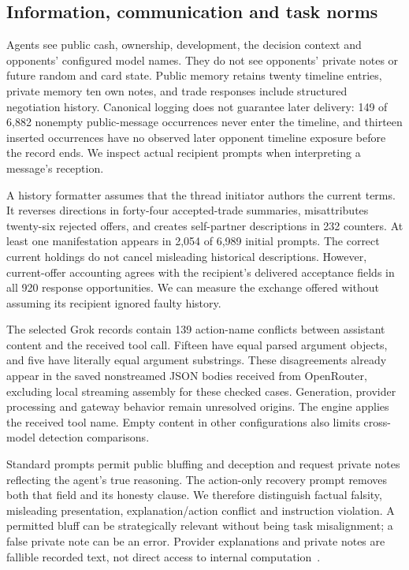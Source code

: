 \subsection{Information, communication and task norms}

Agents see public cash, ownership, development, the decision context and opponents' configured model names. They do not see opponents' private notes or future random and card state. Public memory retains twenty timeline entries, private memory ten own notes, and trade responses include structured negotiation history. Canonical logging does not guarantee later delivery: 149 of 6,882 nonempty public-message occurrences never enter the timeline, and thirteen inserted occurrences have no observed later opponent timeline exposure before the record ends. We inspect actual recipient prompts when interpreting a message's reception.

A history formatter assumes that the thread initiator authors the current terms. It reverses directions in forty-four accepted-trade summaries, misattributes twenty-six rejected offers, and creates self-partner descriptions in 232 counters. At least one manifestation appears in 2,054 of 6,989 initial prompts. The correct current holdings do not cancel misleading historical descriptions. However, current-offer accounting agrees with the recipient's delivered acceptance fields in all 920 response opportunities. We can measure the exchange offered without assuming its recipient ignored faulty history.

The selected Grok records contain 139 action-name conflicts between assistant content and the received tool call. Fifteen have equal parsed argument objects, and five have literally equal argument substrings. These disagreements already appear in the saved nonstreamed JSON bodies received from OpenRouter, excluding local streaming assembly for these checked cases. Generation, provider processing and gateway behavior remain unresolved origins. The engine applies the received tool name. Empty content in other configurations also limits cross-model detection comparisons.

Standard prompts permit public bluffing and deception and request private notes reflecting the agent's true reasoning. The action-only recovery prompt removes both that field and its honesty clause. We therefore distinguish factual falsity, misleading presentation, explanation/action conflict and instruction violation. A permitted bluff can be strategically relevant without being task misalignment; a false private note can be an error. Provider explanations and private notes are fallible recorded text, not direct access to internal computation~\cite{turpin2023unfaithful,lanham2023faithfulness}.

